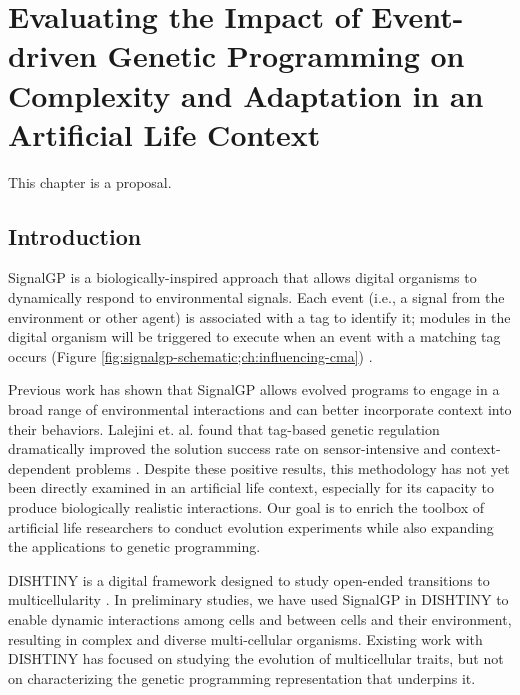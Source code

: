 \chapter{Evaluating the Impact of Event-driven Genetic Programming on Complexity and Adaptation in an Artificial Life Context}
\label{ch:influencing-cna}

\noindent
This chapter is a proposal.

\section{Introduction}

SignalGP is a biologically-inspired approach that allows digital organisms to dynamically respond to environmental signals.
Each event (i.e., a signal from the environment or other agent) is associated with a tag to identify it; modules in the digital organism will be triggered to execute when an event with a matching tag occurs (Figure \ref{fig:signalgp-schematic;ch:influencing-cma}) \citep{lalejini2018evolving}.

Previous work has shown that SignalGP allows evolved programs to engage in a broad range of environmental interactions and can better incorporate context into their behaviors.
Lalejini et. al. found that tag-based genetic regulation dramatically improved the solution success rate on sensor-intensive and context-dependent problems \citep{lalejini2018evolving, lalejini2021tag}.
Despite these positive results, this methodology has not yet been directly examined in an artificial life context, especially for its capacity to produce biologically realistic interactions.
Our goal is to enrich the toolbox of artificial life researchers to conduct evolution experiments while also expanding the applications to genetic programming.



DISHTINY is a digital framework designed to study open-ended transitions to multicellularity \citep{moreno2019toward}.
In preliminary studies, we have used SignalGP in DISHTINY to enable dynamic interactions among cells and between cells and their environment, resulting in complex and diverse multi-cellular organisms.
Existing work with DISHTINY has focused on studying the evolution of multicellular traits, but not on characterizing the genetic programming representation that underpins it.

